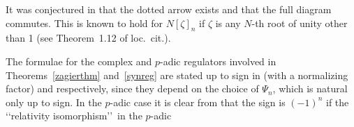 \documentclass{amsart}
\begin{document}
\begin{remark}\label{synregremark}
It was conjectured in \cite[Conjecture~1.14]{BdJ03} that the dotted arrow exists and that the full diagram commutes.
This is known to  hold for $ N [{\zeta}]_n $ if $ {\zeta} $ is any $ N $-th root of unity other than 1 (see Theorem~1.12 of loc.\ cit.).
\end{remark}

\begin{remark}
The formulae for the complex and {$p$-adic{\futurelet{}}} regulators involved in Theorems~\ref{zagierthm} and~\ref{synreg} are stated up to sign
in \cite[Proposition~4.1]{dJ95} (with a normalizing factor) and \cite[Theorem~1.10(2) or Proposition~7.14]{BdJ03} respectively, since they
depend on the choice of $ \Psi_n $, which is natural only up to sign.
In the {$p$-adic{\futurelet{}}} case it is clear from \cite[Proposition~7.10]{BdJ03} that the sign is $ (-1)^n $ if the
\lq\lq relativity isomorphism\rq\rq\ in the {$p$-adic{\futurelet{}}}
\end{remark}
\end{document}
